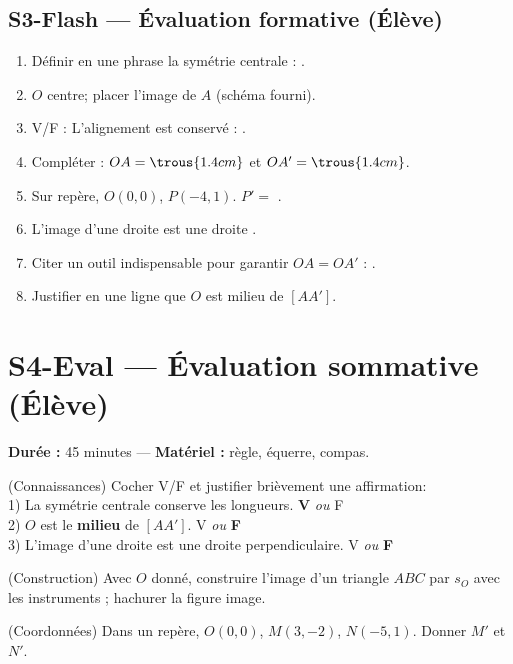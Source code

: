 \subsection*{S3-Flash — Évaluation formative (Élève)}
\begin{exercice}
	\begin{enumerate}
		\item Définir en une phrase la symétrie centrale : \trous{5cm}.
		\item $O$ centre; placer l’image de $A$ (schéma fourni).
		\item V/F : L’alignement est conservé : \trous{1.2cm}.
		\item Compléter : $OA = \trous{1.4cm}$ et $OA'=\trous{1.4cm}$.
		\item Sur repère, $O(0,0)$, $P( {-}4,1 )$. $P'=$ \trous{3cm}.
		\item L’image d’une droite est une droite \trous{3cm}.
		\item Citer un outil indispensable pour garantir $OA=OA'$ : \trous{3cm}.
		\item Justifier en une ligne que $O$ est milieu de $[AA']$.
	\end{enumerate}
\end{exercice}

\newpage
\section*{S4-Eval — Évaluation sommative (Élève)}
\textbf{Durée :} 45 minutes — \textbf{Matériel :} règle, équerre, compas.
\begin{exercice}[points 2]
	(Connaissances) Cocher V/F et justifier brièvement une affirmation:\\
	1) La symétrie centrale conserve les longueurs. \quad \textbf{V} \quad \textit{ou} \quad F\\
	2) $O$ est le \textbf{milieu} de $[AA']$. \quad V \quad \textit{ou} \quad \textbf{F}\\
	3) L’image d’une droite est une droite perpendiculaire. \quad V \quad \textit{ou} \quad \textbf{F}
\end{exercice}

\begin{exercice}[points 4]
	(Construction) Avec $O$ donné, construire l’image d’un triangle $ABC$ par $s_O$ avec les instruments ; hachurer la figure image.
\end{exercice}

\begin{exercice}[points 3]
	(Coordonnées) Dans un repère, $O(0,0)$, $M(3,{-}2)$, $N({-}5,1)$. Donner $M'$ et $N'$.
\end{exercice}

